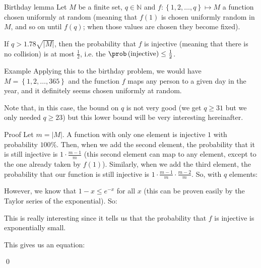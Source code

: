 \documentclass[a4paper]{article}
\begin{document}
\begin{parag}{Birthday lemma}
    Let $M$ be a finite set, $q \in \mathbb{N}$ and $f: \left\{1, 2, \ldots, q\right\} \mapsto M$ a function chosen uniformly at random  (meaning that $f\left(1\right)$ is chosen uniformly random in $M$, and so on until $f\left(q\right)$; when those values are chosen they become fixed).

    If $q > 1.78\sqrt{\left|M\right|}$, then the probability that $f$ is injective (meaning that there is no collision) is at most $\frac{1}{2}$, i.e. the $\prob\left(\text{injective}\right) \leq \frac{1}{2}$.

    \begin{subparag}{Example}
        Applying this to the birthday problem, we would have $M = \left\{1, 2, \ldots, 365\right\}$ and the function $f$ maps any person to a given day in the year, and it definitely seems chosen uniformly at random.

        Note that, in this case, the bound on $q$ is not very good (we get $q \geq 31$ but we only needed $q \geq 23$) but this lower bound will be very interesting hereinafter.
    \end{subparag}

    \begin{subparag}{Proof}
        Let $m = \left|M\right|$. A function with only one element is injective $1$ with probability $100\%$. Then, when we add the second element, the probability that it is still injective is $1\cdot \frac{m-1}{m}$ (this second element can map to any element, except to the one already taken by $f\left(1\right)$). Similarly, when we add the third element, the probability that our function is still injective is $1 \cdot  \frac{m-1}{m} \cdot \frac{m-2}{m}$. So, with $q$ elements: 
            
        However, we know that $1 - x \leq e^{-x}$ for all $x$ (this can be proven easily by the Taylor series of the exponential). So: 

        This is really interesting since it tells us that the probability that $f$ is injective is exponentially small.
            
        This gives us an equation: 
        
        \qed
    \end{subparag}
\end{parag}
\end{document}
